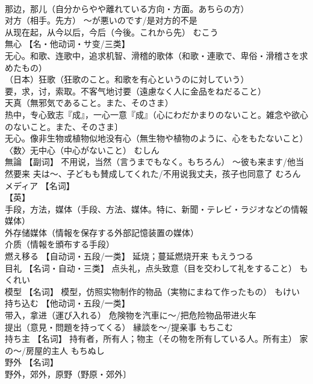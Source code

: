\documentclass[8pt]{extreport}
\begin{document}
\begin{CJK}{UTF8}{min}
\\	那边，那儿（自分からやや離れている方向・方面。あちらの方） 
\\	对方（相手。先方） ～が悪いのです/是对方的不是 
\\	从现在起，从今以后，今后（今後。これから先）	むこう	
\\	無心	【名・他动词・サ变/三类】 
\\	无心。和歌、连歌中，追求机智、滑稽的歌体（和歌・連歌で、卑俗・滑稽さを求めたもの） 
\\	（日本）狂歌（狂歌のこと。和歌を有心というのに対していう） 
\\	要，求，讨，索取。不客气地讨要（遠慮なく人に金品をねだること） 
\\	天真（無邪気であること。また、そのさま） 
\\	热中，专心致志『成』，一心一意『成』（心にわだかまりのないこと。雑念や欲心のないこと。また、そのさま〕 
\\	无心。像非生物或植物似地没有心（無生物や植物のように、心をもたないこと） 
\\	〈数〉无中心（中心がないこと）	むしん	
\\	無論	【副词】 不用说，当然（言うまでもなく。もちろん） ～彼も来ます/他当然要来 夫は～、子どもも賛成してくれた/不用说我丈夫，孩子也同意了	むろん	
\\	メディア	【名词】 
\\	【英】
\\	手段，方法，媒体（手段、方法、媒体。特に、新聞・テレビ・ラジオなどの情報媒体） 
\\	外存储媒体（情報を保存する外部記憶装置の媒体） 
\\	介质（情報を頒布する手段）		
\\	燃え移る	【自动词・五段/一类】 延烧；蔓延燃烧开来	もえうつる	
\\	目礼	【名词・自动・三类】 点头礼，点头致意（目を交わして礼をすること）	もくれい	
\\	模型	【名词】 模型，仿照实物制作的物品（実物にまねて作ったもの）	もけい	
\\	持ち込む	【他动词・五段/一类】 
\\	带入，拿进（運び入れる） 危険物を汽車に～/把危险物品带进火车 
\\	提出（意見・問題を持ってくる） 縁談を～/提亲事	もちこむ	
\\	持ち主	【名词】 持有者，所有人；物主（その物を所有している人。所有主） 家の～/房屋的主人	もちぬし	
\\	野外	【名词】 
\\	野外，郊外，原野（野原・郊外〕 

\end{CJK}
\end{document}
